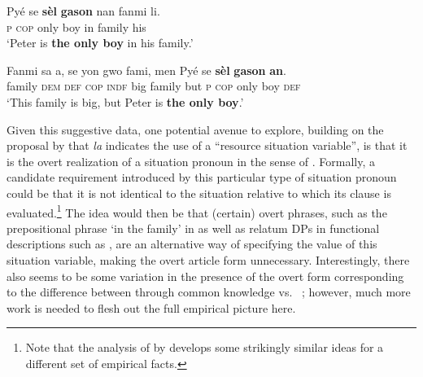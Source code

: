 \documentclass[output=paper
,modfonts
,nonflat]{langscibook}
\begin{document}
\begin{exe}
\ex\label{ex:schwarz:26} 
\begin{xlist}
\ex \label{ex:schwarz:26a}\gll Py\'e se	\textbf{s\`el}	\textbf{gason} nan fanmi li.\\ 
\textsc{p} \textsc{cop} {only} {boy} in family his\\
\glt `Peter is \textbf{the only boy} in his family.'

\ex \label{ex:schwarz:26b}\gll 	Fanmi sa	a,	se	yon	gwo fami, men
Py\'e se	\textbf{s\`el} \textbf{gason} \textbf{an}.\\
 family \textsc{dem} \textsc{def} \textsc{cop} \textsc{indf} big family but \textsc{p}	\textsc{cop} only boy	\textsc{def}\\
\glt `This family is big, but Peter is \textbf{the only boy}.'

\end{xlist}
\end{exe}


Given this suggestive data, one potential avenue to explore, building
on the proposal by \citet{Wespel2008} that \textit{la} indicates the
use of a ``resource situation variable'', is that it is the overt
realization of a situation pronoun in the sense of
\citet{Percus2000}. Formally, a candidate requirement introduced by
this particular type of situation pronoun could be that it is not
identical to the  situation relative to which its clause is
evaluated.\footnote{Note that the analysis of  
  by \citet{Wolter2006} develops some strikingly similar ideas for a
  different set of empirical facts.} The idea would then be that
(certain) overt phrases, such as the prepositional phrase `in the
family' in  as well as relatum DPs in functional
descriptions such as , are an alternative way of specifying the
value of this situation variable, making the overt article form
unnecessary. Interestingly, there also seems to be some variation in
the presence of the overt form
corresponding to the difference between  through
common knowledge vs.\  ; however, much more
work is needed to flesh out the full empirical picture here.

\end{document}
